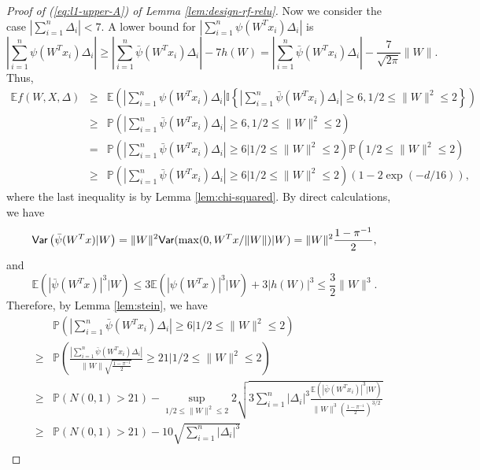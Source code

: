 \begin{proof}[Proof of (\ref{eq:l1-upper-A}) of Lemma \ref{lem:design-rf-relu}]
Now we consider the case $\left|\sum_{i=1}^n\Delta_i\right|< 7$. A lower bound for $\left|\sum_{i=1}^n\psi(W^Tx_i)\Delta_i\right|$ is
\begin{equation}
\left|\sum_{i=1}^n\psi(W^Tx_i)\Delta_i\right| \geq \left|\sum_{i=1}^n\bar{\psi}(W^Tx_i)\Delta_i\right| - 7h(W) = \left|\sum_{i=1}^n\bar{\psi}(W^Tx_i)\Delta_i\right| - \frac{7}{\sqrt{2\pi}}\|W\|. \label{eq:seven} 
\end{equation}
Thus,
\begin{eqnarray}
\nonumber \mathbb{E}f(W,X,\Delta) &\geq& \mathbb{E}\left(\left|\sum_{i=1}^n\psi(W^Tx_i)\Delta_i\right|\mathbb{I}\left\{\left|\sum_{i=1}^n\bar{\psi}(W^Tx_i)\Delta_i\right|\geq 6, 1/2\leq \|W\|^2\leq 2\right\}\right) \\
\nonumber &\geq& \mathbb{P}\left(\left|\sum_{i=1}^n\bar{\psi}(W^Tx_i)\Delta_i\right|\geq 6, 1/2\leq \|W\|^2\leq 2\right) \\
\nonumber &=& \mathbb{P}\left(\left|\sum_{i=1}^n\bar{\psi}(W^Tx_i)\Delta_i\right|\geq 6\Big|1/2\leq \|W\|^2\leq 2\right)\mathbb{P}\left(1/2\leq \|W\|^2\leq 2\right) \\
\nonumber &\geq& \mathbb{P}\left(\left|\sum_{i=1}^n\bar{\psi}(W^Tx_i)\Delta_i\right|\geq 6\Big|1/2\leq \|W\|^2\leq 2\right)\left(1-2\exp(-d/16)\right),
\end{eqnarray}
where the last inequality is by Lemma \ref{lem:chi-squared}. By direct calculations, we have
\begin{equation}
\Var\left(\bar{\psi}(W^Tx)|W\right)=\|W\|^2\Var(\max(0,W^Tx/\|W\|)|W)=\|W\|^2\frac{1-\pi^{-1}}{2}, \label{eq:cond-var-X-W}
\end{equation}
and
$$\mathbb{E}\left(|\bar{\psi}(W^Tx)|^3|W\right) \leq 3\mathbb{E}\left(|\psi(W^Tx)|^3|W\right)+3|h(W)|^3 \leq \frac{3}{2}\|W\|^3.$$
Therefore, by Lemma \ref{lem:stein}, we have
\begin{eqnarray}
\nonumber && \mathbb{P}\left(\left|\sum_{i=1}^n\bar{\psi}(W^Tx_i)\Delta_i\right|\geq 6\Big|1/2\leq \|W\|^2\leq 2\right) \\
\nonumber &\geq& \mathbb{P}\left(\frac{\left|\sum_{i=1}^n\bar{\psi}(W^Tx_i)\Delta_i\right|}{\|W\|\sqrt{\frac{1-\pi^{-1}}{2}}}\geq 21\Bigg|1/2\leq \|W\|^2\leq 2\right) \\
\nonumber &\geq& \mathbb{P}\left(N(0,1)>21\right) - \sup_{1/2\leq \|W\|^2\leq 2} 2\sqrt{3\sum_{i=1}^n|\Delta_i|^3\frac{\mathbb{E}\left(|\bar{\psi}(W^Tx_i)|^3|W\right)}{\|W\|^3\left(\frac{1-\pi^{-1}}{2}\right)^{3/2}}} \\
\nonumber &\geq& \mathbb{P}\left(N(0,1)>21\right) - 10\sqrt{\sum_{i=1}^n|\Delta_i|^3} \\

\end{eqnarray}
\end{proof}
